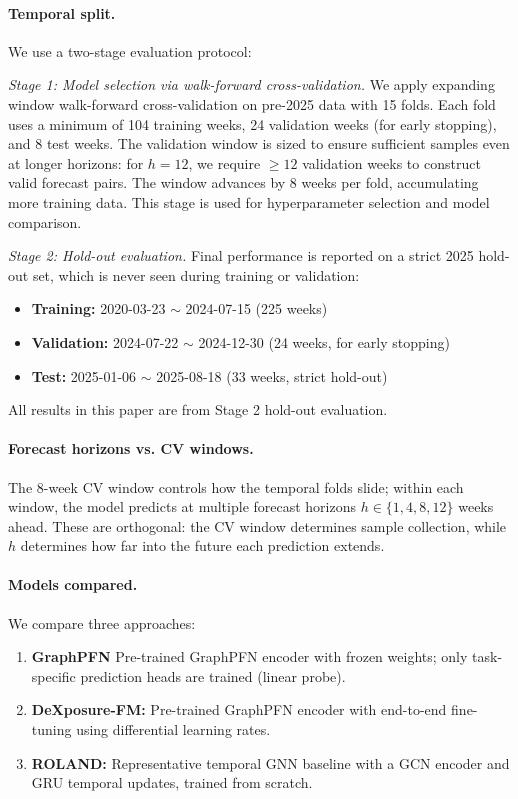 \paragraph{Temporal split.}
We use a two-stage evaluation protocol:

\textit{Stage 1: Model selection via walk-forward cross-validation.}
We apply expanding window walk-forward cross-validation on pre-2025 data with 15 folds. Each fold uses a minimum of 104 training weeks, 24 validation weeks (for early stopping), and 8 test weeks. The validation window is sized to ensure sufficient samples even at longer horizons: for $h=12$, we require $\geq 12$ validation weeks to construct valid forecast pairs. The window advances by 8 weeks per fold, accumulating more training data. This stage is used for hyperparameter selection and model comparison.

\textit{Stage 2: Hold-out evaluation.}
Final performance is reported on a strict 2025 hold-out set, which is never seen during training or validation:
\begin{itemize}
  \item \textbf{Training:} 2020-03-23 $\sim$ 2024-07-15 (225 weeks)
  \item \textbf{Validation:} 2024-07-22 $\sim$ 2024-12-30 (24 weeks, for early stopping)
  \item \textbf{Test:} 2025-01-06 $\sim$ 2025-08-18 (33 weeks, strict hold-out)
\end{itemize}
All results in this paper are from Stage 2 hold-out evaluation.

\paragraph{Forecast horizons vs. CV windows.}
The 8-week CV window controls how the temporal folds slide; within each window, the model predicts at multiple forecast horizons $h \in \{1, 4, 8, 12\}$ weeks ahead. These are orthogonal: the CV window determines sample collection, while $h$ determines how far into the future each prediction extends.

\paragraph{Models compared.}
We compare three approaches:
\begin{enumerate}
  \item \textbf{GraphPFN} Pre-trained GraphPFN encoder with frozen weights; only task-specific prediction heads are trained (linear probe).
  \item \textbf{DeXposure-FM:} Pre-trained GraphPFN encoder with end-to-end fine-tuning using differential learning rates.
\item \textbf{ROLAND:} Representative temporal GNN baseline with a GCN encoder and GRU temporal updates, trained from scratch.
\end{enumerate}

